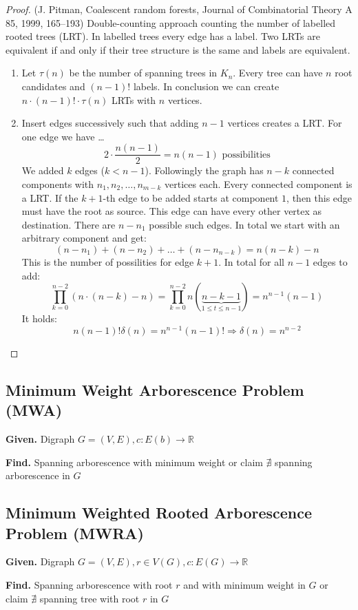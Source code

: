 \documentclass[a4paper]{article}
\theoremstyle{definition}
\newcommand{\given}[1]{\textbf{Given.} #1\par}
\newcommand{\find}[1]{\textbf{Find.} #1\par}
\begin{document}
\begin{proof}
(J. Pitman, Coalescent random forests, Journal of Combinatorial Theory A 85, 1999, 165--193)
Double-counting approach counting the number of labelled rooted trees (LRT). In labelled trees every edge has a label. Two LRTs are equivalent if and only if their tree structure is the same and labels are equivalent.

\begin{enumerate}
  \item Let $\tau(n)$ be the number of spanning trees in $K_n$. Every tree can have $n$ root candidates and $(n-1)!$ labels. In conclusion we can create $n \cdot (n-1)! \cdot \tau(n)$ LRTs with $n$ vertices.
  \item Insert edges successively such that adding $n-1$ vertices creates a LRT. For one edge we have \dots
    \[
      2 \cdot \frac{n(n-1)}{2} = n(n-1) \text{ possibilities}
    \]
    We added $k$ edges ($k < n -1$). Followingly the graph has $n-k$ connected components with $n_1, n_2, \ldots, n_{m-k}$ vertices each. Every connected component is a LRT. If the $k+1$-th edge to be added starts at component $1$, then this edge must have the root as source. This edge can have every other vertex as destination. There are $n-n_1$ possible such edges. In total we start with an arbitrary component and get:
    \[
      (n - n_1) + (n - n_2) + \ldots + (n - n_{n-k}) = n (n-k) - n
    \]
    This is the number of possilities for edge $k+1$.
    In total for all $n-1$ edges to add:
    \[
      \prod_{k=0}^{n-2} (n \cdot (n-k) - n) = \prod_{k=0}^{n-2} n (\underbrace{n - k - 1}_{1 \leq t \leq n-1}) = n^{n-1} (n - 1)
    \]
    It holds:
    \[
      n (n-1) ! \delta(n) = n^{n-1} (n-1)! \Rightarrow \delta(n) = n^{n-2}
    \]
\end{enumerate}
\end{proof}

\subsection{Minimum Weight Arborescence Problem (MWA)}
%
\given{Digraph $G = (V, E), c: E(b) \rightarrow \mathbb{R}$}
\find{Spanning arborescence with minimum weight or claim $\nexists$ spanning arborescence in $G$}
%
\subsection{Minimum Weighted Rooted Arborescence Problem (MWRA)}
%
\given{Digraph $G = (V, E), r \in V(G), c: E(G) \rightarrow \mathbb{R}$}
\find{Spanning arborescence with root $r$ and with minimum weight in $G$ or claim $\nexists$ spanning tree with root $r$ in $G$}
%
\end{document}

